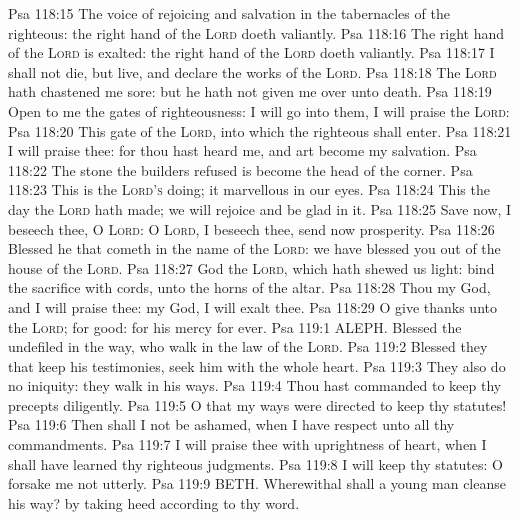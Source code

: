 \vs Psa 118:15 The voice of rejoicing and salvation  in the tabernacles of the righteous: the right hand of the \textsc{Lord} doeth valiantly.
\vs Psa 118:16 The right hand of the \textsc{Lord} is exalted: the right hand of the \textsc{Lord} doeth valiantly.
\vs Psa 118:17 I shall not die, but live, and declare the works of the \textsc{Lord}.
\vs Psa 118:18 The \textsc{Lord} hath chastened me sore: but he hath not given me over unto death.
\vs Psa 118:19 Open to me the gates of righteousness: I will go into them,  I will praise the \textsc{Lord}:
\vs Psa 118:20 This gate of the \textsc{Lord}, into which the righteous shall enter.
\vs Psa 118:21 I will praise thee: for thou hast heard me, and art become my salvation.
\vs Psa 118:22 The stone  the builders refused is become the head  of the corner.
\vs Psa 118:23 This is the \textsc{Lord's} doing; it  marvellous in our eyes.
\vs Psa 118:24 This  the day  the \textsc{Lord} hath made; we will rejoice and be glad in it.
\vs Psa 118:25 Save now, I beseech thee, O \textsc{Lord}: O \textsc{Lord}, I beseech thee, send now prosperity.
\vs Psa 118:26 Blessed  he that cometh in the name of the \textsc{Lord}: we have blessed you out of the house of the \textsc{Lord}.
\vs Psa 118:27 God  the \textsc{Lord}, which hath shewed us light: bind the sacrifice with cords,  unto the horns of the altar.
\vs Psa 118:28 Thou  my God, and I will praise thee:  my God, I will exalt thee.
\vs Psa 118:29 O give thanks unto the \textsc{Lord}; for  good: for his mercy  for ever.
\vs Psa 119:1 ALEPH. Blessed  the undefiled in the way, who walk in the law of the \textsc{Lord}.
\vs Psa 119:2 Blessed  they that keep his testimonies,  seek him with the whole heart.
\vs Psa 119:3 They also do no iniquity: they walk in his ways.
\vs Psa 119:4 Thou hast commanded  to keep thy precepts diligently.
\vs Psa 119:5 O that my ways were directed to keep thy statutes!
\vs Psa 119:6 Then shall I not be ashamed, when I have respect unto all thy commandments.
\vs Psa 119:7 I will praise thee with uprightness of heart, when I shall have learned thy righteous judgments.
\vs Psa 119:8 I will keep thy statutes: O forsake me not utterly.
\vs Psa 119:9 BETH. Wherewithal shall a young man cleanse his way? by taking heed  according to thy word.
